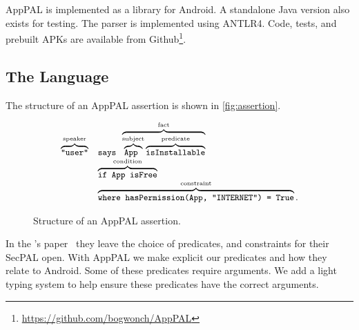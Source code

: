 \documentclass[a4paper]{scrartcl}
\begin{document}
AppPAL is implemented as a library for Android. 
A standalone Java version also exists for testing.  
The parser is implemented using ANTLR4.
Code, tests, and prebuilt APKs are available from Github\footnote{\url{https://github.com/bogwonch/AppPAL}}.

\subsection{The Language}
\label{ssec:language}

The structure of an AppPAL assertion is shown in \autoref{fig:assertion}.

\begin{figure}
  \centering
  \begin{equation*}\small
    \begin{array}{r l}
      \overbrace{\text{\ttfamily "user"}}^{\text{speaker}} & 
      \text{\ttfamily says }\overbrace{\overbrace{\text{\ttfamily App }}^{\text{subject}}\overbrace{\text{\ttfamily isInstallable}}^{\text{predicate}}}^{\text{fact}} \\
      & \overbrace{\text{\ttfamily if App isFree}}^{\text{condition}} \\
      & \overbrace{\text{\ttfamily where hasPermission(App, "INTERNET") = True}}^{\text{constraint}}. 
    \end{array}
  \end{equation*}
  \caption{Structure of an AppPAL assertion.}
\label{fig:assertion}
\end{figure}

In the \citeauthor{Becker:2006vh}'s paper~\citep{Becker:2006vh} they leave the choice of predicates, and constraints for their SecPAL open.
With AppPAL we make explicit our predicates and how they relate to Android.  
Some of these predicates require arguments.
We add a light typing system to help ensure these predicates have the correct arguments.
\end{document}
